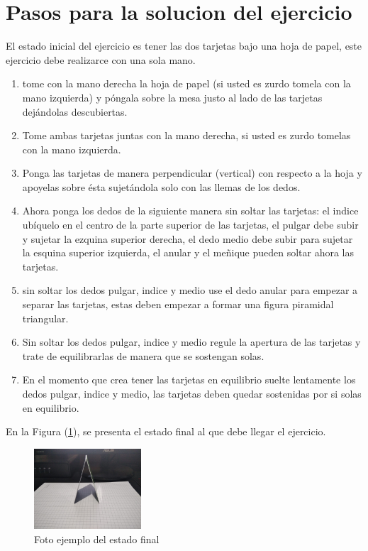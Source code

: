 \documentclass{article}
\begin{document}
\section{Pasos para la solucion del ejercicio}
El estado inicial del ejercicio es tener las dos tarjetas bajo una hoja de papel, este ejercicio debe realizarce con una sola mano.
\begin{enumerate}[1.]
    \item tome con la mano derecha la hoja de papel (si usted es zurdo tomela con la mano izquierda) y póngala sobre la mesa justo al lado de las tarjetas dejándolas descubiertas. 
    \item Tome ambas tarjetas juntas con la mano derecha, si usted es zurdo tomelas con la mano izquierda. 
    \item Ponga las tarjetas  de manera perpendicular (vertical) con respecto a la hoja y apoyelas sobre ésta sujetándola solo con las llemas de los dedos.
    \item Ahora ponga los dedos de la siguiente manera sin soltar las tarjetas: el indice ubíquelo en el centro de la parte superior de las tarjetas, el pulgar debe subir y sujetar la ezquina superior derecha, el dedo medio debe subir para sujetar la esquina superior izquierda, el anular y el meñique pueden soltar ahora las tarjetas.
    \item sin soltar los dedos pulgar, indice y medio use el dedo anular para empezar a separar las tarjetas, estas deben empezar a formar una figura piramidal triangular.
    \item Sin soltar los dedos pulgar, indice y medio regule la apertura de las tarjetas y trate de equilibrarlas de manera que se sostengan solas.
    \item En el momento que crea tener las tarjetas en equilibrio suelte lentamente los dedos pulgar, indice y medio, las tarjetas deben quedar sostenidas por si solas en equilibrio. 
\end{enumerate}
En la Figura (\ref{fig:estado-final}), se presenta el estado final al que debe llegar el ejercicio.

\begin{figure}[ht]
\includegraphics[width=4cm]{estado-final.jpeg}
\centering
\caption{Foto ejemplo del estado final}
\label{fig:estado-final}
\end{figure}

\newpage
\end{document}
